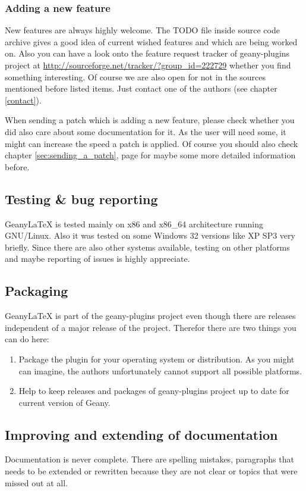 \documentclass[%
paper=a4,%
fontsize=11pt,%
twoside=false,%
DIV18,
headsepline,
plainheadsepline,
footsepline,
plainfootsepline,
bibliography=totoc,%
listof=totoc,%
BCOR10mm,%
parskip=half,%
openany,%
]{scrartcl}
\begin{document}
\subsubsection{Adding a new feature}
New features are always highly welcome. The TODO file inside source
code archive gives a good idea of current wished features and which
are being worked on. Also you can have a look onto the feature request
tracker of geany-plugins project at
\url{http://sourceforge.net/tracker/?group\_id=222729} whether you find
something interesting. Of course we are also open for not in the
sources mentioned before listed items. Just contact one of the authors
(see chapter \ref{contact}).

When sending a patch which is adding a new feature, please check
whether you did also care about some documentation for it. As the
user will need some, it might can increase the speed a patch is
applied. Of course you should also check chapter \ref{sec:sending_a_patch},
page \pageref{sec:sending_a_patch} for maybe some more detailed
information before.

\subsection{Testing \& bug reporting} Geany\LaTeX{} is tested mainly
on x86 and x86\_64 architecture running GNU/Linux. Also it was
tested on some Windows 32 versions like XP SP3 very briefly. Since
there are also other systems available, testing on other platforms
and maybe reporting of issues is highly appreciate.

\subsection{Packaging}
Geany\LaTeX{} is part of the geany-plugins project even though there
are releases independent of a major release of the project. Therefor
there are two things you can do here:
\begin{enumerate}
	\item Package the plugin for your operating system or
	distribution. As you might can imagine, the authors unfortunately
	cannot support all possible platforms.
	\item Help to keep releases and packages of geany-plugins project
	up to date for current version of Geany.
\end{enumerate}


\subsection{Improving and extending of documentation}
Documentation is never complete. There are spelling mistakes,
paragraphs that needs to be extended or rewritten because they are not
clear or topics that were missed out at all.
\end{document}
